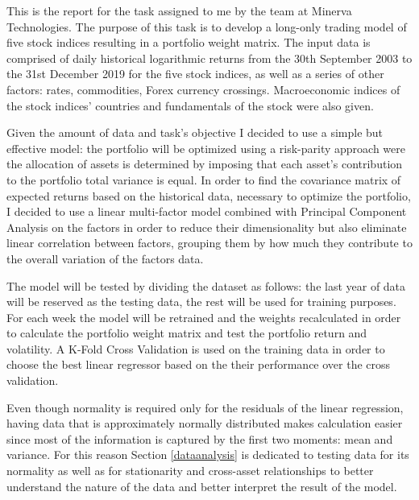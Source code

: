 


This is the report for the task assigned to me by the team at Minerva Technologies. The purpose of this task is to develop a long-only trading model of five stock indices resulting in a portfolio weight matrix. The input data is comprised of daily historical logarithmic returns from the 30th September 2003 to the 31st December 2019 for the five stock indices, as well as a series of other factors: rates, commodities, Forex currency crossings. Macroeconomic indices of the stock indices' countries and fundamentals of the stock were also given.

Given the amount of data and task's objective I decided to use a simple but effective model: the portfolio will be optimized using a risk-parity approach were the allocation of assets is determined by imposing that each asset's contribution to the portfolio total variance is equal. In order to find the covariance matrix of expected returns based on the historical data, necessary to optimize the portfolio, I decided to use a linear multi-factor model combined with Principal Component Analysis on the factors in order to reduce their dimensionality but also eliminate linear correlation between factors, grouping them by how much they contribute to the overall variation of the factors data.

The model will be tested by dividing the dataset as follows: the last year of data will be reserved as the testing data, the rest will be used for training purposes.
For each week the model will be retrained and the weights recalculated in order to calculate the portfolio weight matrix and test the portfolio return and volatility. A K-Fold Cross Validation is used on the training data in order to choose the best linear regressor based on the their performance over the cross validation.


Even though normality is required only for the residuals of the linear regression, having data that is approximately normally distributed makes calculation easier since most of the information is captured by the first two moments: mean and variance. For this reason Section \ref{dataanalysis} is dedicated to testing data for its normality as well as for stationarity and cross-asset relationships to better understand the nature of the data and better interpret the result of the model.
